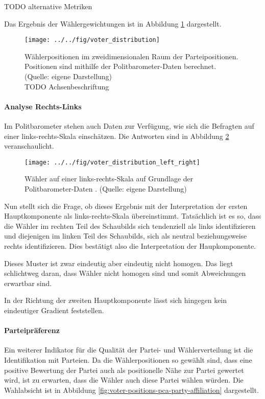 TODO alternative Metriken

Das Ergebnis der Wählergewichtungen ist in Abbildung \ref{fig:voter-positions-pca} dargestellt.

\begin{figure}[htb]
	\centering
	\texttt{[image: ../../fig/voter\_distribution]}
	\caption{Wählerpositionen im zweidimensionalen Raum der Parteipositionen. Positionen sind mithilfe der Politbarometer-Daten \citep{politbarometer} berechnet. (Quelle: eigene Darstellung)\\TODO Achsenbeschriftung}
	\label{fig:voter-positions-pca}
\end{figure}

\paragraph{Analyse Rechts-Links}
Im Politbarometer stehen auch Daten zur Verfügung, wie sich die Befragten auf einer links-rechts-Skala einschätzen. Die Antworten sind in Abbildung \ref{fig:voter-positions-pca-left-right} veranschaulicht.

\begin{figure}[htb]
	\centering
	\texttt{[image: ../../fig/voter\_distribution\_left\_right]}
	\caption{Wähler auf einer links-rechts-Skala auf Grundlage der Politbarometer-Daten \citep{politbarometer}. (Quelle: eigene Darstellung)}
	\label{fig:voter-positions-pca-left-right}
\end{figure}

Nun stellt sich die Frage, ob dieses Ergebnis mit der Interpretation der ersten Hauptkomponente als links-rechts-Skala übereinstimmt. Tatsächlich ist es so, dass die Wähler im rechten Teil des Schaubilds sich tendenziell als links identifizieren und diejenigen im linken Teil des Schaubilds, sich als neutral beziehungsweise rechts identifizieren. Dies bestätigt also die Interpretation der Haupkomponente.

Dieses Muster ist zwar eindeutig aber eindeutig nicht homogen. Das liegt schlichtweg daran, dass Wähler nicht homogen sind und somit Abweichungen erwartbar sind.

In der Richtung der zweiten Hauptkomponente lässt sich hingegen kein eindeutiger Gradient feststellen.

\paragraph{Parteipräferenz}

Ein weiterer Indikator für die Qualität der Partei- und Wählerverteilung ist die Identifikation mit Parteien. Da die Wählerpositionen so gewählt sind, dass eine positive Bewertung der Partei auch als positionelle Nähe zur Partei gewertet wird, ist zu erwarten, dass die Wähler auch diese Partei wählen würden. Die Wahlabsicht ist in Abbildung \ref{fig:voter-positions-pca-party-affiliation} dargestellt.

